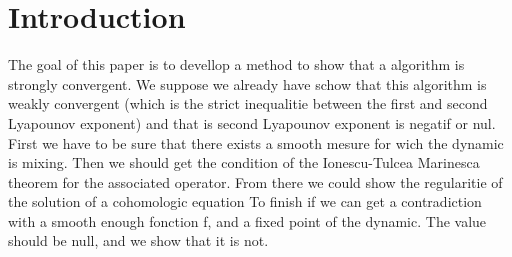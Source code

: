 \documentclass[12pt]{article}
\theoremstyle{plain}%
\theoremstyle{definition}
\theoremstyle{remark}
\begin{document}
\tableofcontents
\section*{Introduction}
\tabto{2cm} The goal of this paper is to devellop a method to show that a algorithm is strongly convergent.
\tabto{2cm}We suppose we already have schow that this algorithm is weakly convergent (which is the strict inequalitie between the first and second Lyapounov exponent) and that is second Lyapounov exponent is negatif or nul. \newline
\tabto{2cm}First we have to be sure that there exists a smooth mesure for wich the dynamic is mixing.
Then we should get the condition of the Ionescu-Tulcea Marinesca theorem for the associated operator.\newline
\tabto{2cm} From there we could show the regularitie of the solution of a cohomologic equation
To finish if we can get a contradiction with a smooth enough fonction f, and a fixed point of the dynamic. The value should be null, and we show that it is not.
\end{document}
